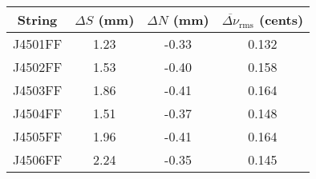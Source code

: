 \begin{tabular}{cccc}
\toprule
String & $\Delta S$ (mm) & $\Delta N$ (mm) & $\overline{\Delta \nu}_\text{rms}$ (cents) \\
\midrule
J4501FF & 1.23 & -0.33 & 0.132 \\
J4502FF & 1.53 & -0.40 & 0.158 \\
J4503FF & 1.86 & -0.41 & 0.164 \\
J4504FF & 1.51 & -0.37 & 0.148 \\
J4505FF & 1.96 & -0.41 & 0.164 \\
J4506FF & 2.24 & -0.35 & 0.145 \\
\bottomrule
\end{tabular}
